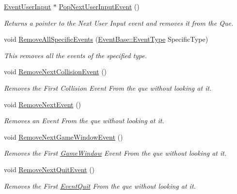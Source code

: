 \begin{DoxyCompactItemize}
\hyperlink{classphys_1_1EventUserInput}{EventUserInput} $\ast$ \hyperlink{classphys_1_1EventManager_afa89317d4b16c2b7065b9f79a4354654}{PopNextUserInputEvent} ()
\begin{DoxyCompactList}\small\item\em Returns a pointer to the Next User Input event and removes it from the Que. \item\end{DoxyCompactList}\item 
void \hyperlink{classphys_1_1EventManager_ac38a5a7d003a3f92e40c842916094bde}{RemoveAllSpecificEvents} (\hyperlink{classphys_1_1EventBase_a5e6a8564e127f654123f0bf6a2751923}{EventBase::EventType} SpecificType)
\begin{DoxyCompactList}\small\item\em This removes all the events of the specified type. \item\end{DoxyCompactList}\item 
void \hyperlink{classphys_1_1EventManager_a9556b702c4b84bc8e49f1491104b688f}{RemoveNextCollisionEvent} ()
\begin{DoxyCompactList}\small\item\em Removes the First Collision Event From the que without looking at it. \item\end{DoxyCompactList}\item 
void \hyperlink{classphys_1_1EventManager_a2389a44d199f121e1fea741f83248513}{RemoveNextEvent} ()
\begin{DoxyCompactList}\small\item\em Removes an Event From the que without looking at it. \item\end{DoxyCompactList}\item 
void \hyperlink{classphys_1_1EventManager_a8172d685143bf18d0e48810fac25860e}{RemoveNextGameWindowEvent} ()
\begin{DoxyCompactList}\small\item\em Removes the First \hyperlink{classphys_1_1GameWindow}{GameWindow} Event From the que without looking at it. \item\end{DoxyCompactList}\item 
void \hyperlink{classphys_1_1EventManager_a5031871aa6e044764ec2963228f735dd}{RemoveNextQuitEvent} ()
\begin{DoxyCompactList}\small\item\em Removes the First \hyperlink{classphys_1_1EventQuit}{EventQuit} From the que without looking at it. \item\end{DoxyCompactList}\item 

\end{DoxyCompactItemize}
